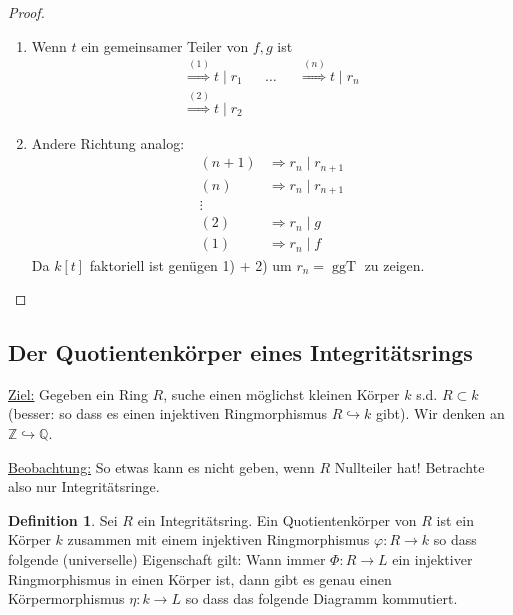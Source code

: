 \documentclass[12pt,parskip=full]{scrartcl}
\newcommand{\setZ}{\mathbb{Z}}
\newcommand{\setQ}{\mathbb{Q}}
\newcommand{\heading}{\underline}
\theoremstyle{definition}
\newtheorem{definition}[theorem]{Definition}
\theoremstyle{remark}
\begin{document}
	\begin{proof}
		\begin{enumerate}
			\item Wenn $t$ ein gemeinsamer Teiler von $f,g$ ist
			\begin{align*}
				\overset{(1)}{\Longrightarrow} t \mid r_1 && \dots && \overset{(n)}{\Longrightarrow} t \mid r_n \\
				\overset{(2)}{\Longrightarrow} t \mid r_2
			\end{align*}
			\item Andere Richtung analog:
			\begin{align*}
				(n+1) &\Longrightarrow r_n \mid r_{n+1} \\
				(n) &\Longrightarrow r_n \mid r_{n+1} \\
				\vdots \\
				(2) &\Longrightarrow r_n \mid g \\
				(1) &\Longrightarrow r_n \mid f
			\end{align*}
			Da $k[t]$ faktoriell ist genügen 1) + 2) um $r_n = \operatorname{ggT}$ zu zeigen.
		\end{enumerate}
	\end{proof}

	\subsection{Der Quotientenkörper eines Integritätsrings}
	
	\heading{Ziel:} Gegeben ein Ring $R$, suche einen möglichst kleinen Körper $k$ s.d. $R \subset k$ (besser: so dass es einen injektiven Ringmorphismus $R \hookrightarrow k$ gibt). Wir denken an $\setZ \hookrightarrow \setQ$.
	
	\heading{Beobachtung:} So etwas kann es nicht geben, wenn $R$ Nullteiler hat! Betrachte also nur Integritätsringe.
	
	\begin{definition}
		Sei $R$ ein Integritätsring. Ein Quotientenkörper von $R$ ist ein Körper $k$ zusammen mit einem injektiven Ringmorphismus $\varphi: R \to k$ so dass folgende (universelle) Eigenschaft gilt: Wann immer $\Phi: R \to L$ ein injektiver Ringmorphismus in einen Körper ist, dann gibt es genau einen Körpermorphismus $\eta: k \to L$ so dass das folgende Diagramm kommutiert.
		
		\begin{center}
		\end{center}
	\end{definition}
\end{document}
